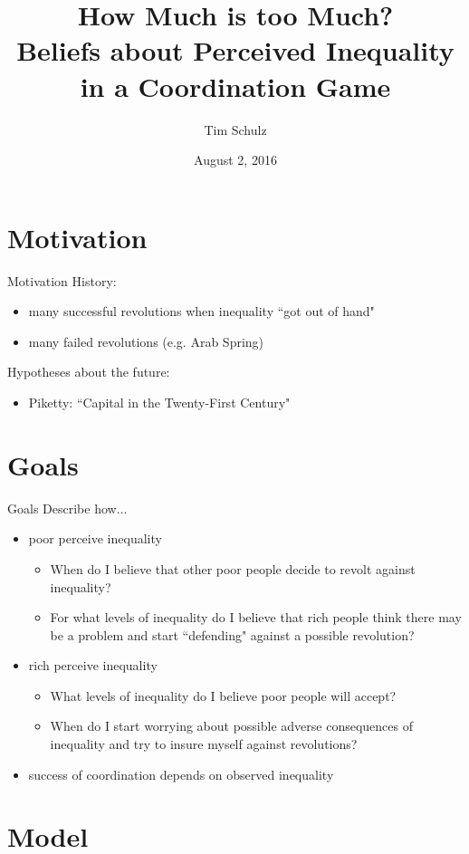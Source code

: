 \documentclass[mathserif]{beamer}
\title[How Much is too Much? -- Beliefs about Perceived Inequality in a Coordination Game]{How Much is too Much?\\
	Beliefs about Perceived Inequality in a Coordination Game}
\author{Tim Schulz}
\institute[SFU]
{
	Simon Fraser University\\
	Department of Economics
}
\date{August 2, 2016}
\begin{document}
	\frame{\titlepage}
	\section{Motivation}
	\begin{frame}{Motivation}
		History:
		\begin{itemize}
			\item many successful revolutions when inequality ``got out of hand"
			\item many failed revolutions (e.g. Arab Spring)
		\end{itemize}
		\pause
		Hypotheses about the future:
		\begin{itemize}
			\item Piketty: ``Capital in the Twenty-First Century"
		\end{itemize}
	\end{frame}
	
	\section{Goals}
	\begin{frame}{Goals}
		Describe how...
		\begin{itemize}[<+->]
			\item poor perceive inequality
			\begin{itemize}
				\item When do I believe that other poor people decide to revolt against inequality?
				\item For what levels of inequality do I believe that rich people think there may be a problem and start ``defending" against a possible revolution?
			\end{itemize}
			\item rich perceive inequality
			\begin{itemize}
				\item What levels of inequality do I believe poor people will accept?
				\item When do I start worrying about possible adverse consequences of inequality and try to insure myself against revolutions?
			\end{itemize}
			\item success of coordination depends on observed inequality
		\end{itemize}
	\end{frame}
	
	\section{Model}
\end{document}
